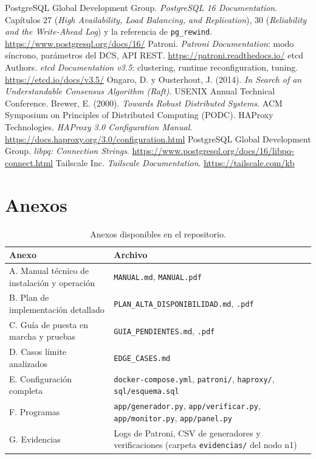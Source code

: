 \documentclass[11pt,a4paper]{article}
\newcommand{\cod}[1]{\texttt{#1}}
\begin{document}
\begin{thebibliography}{9}
 PostgreSQL Global Development Group. \emph{PostgreSQL 16 Documentation}. Capítulos 27 (\emph{High Availability, Load Balancing, and Replication}), 30 (\emph{Reliability and the Write-Ahead Log}) y la referencia de \cod{pg\_rewind}. \url{https://www.postgresql.org/docs/16/}
 Patroni. \emph{Patroni Documentation}: modo síncrono, parámetros del DCS, API REST. \url{https://patroni.readthedocs.io/}
 etcd Authors. \emph{etcd Documentation v3.5}: clustering, runtime reconfiguration, tuning. \url{https://etcd.io/docs/v3.5/}
 Ongaro, D. y Ousterhout, J. (2014). \emph{In Search of an Understandable Consensus Algorithm (Raft)}. USENIX Annual Technical Conference.
 Brewer, E. (2000). \emph{Towards Robust Distributed Systems}. ACM Symposium on Principles of Distributed Computing (PODC).
 HAProxy Technologies. \emph{HAProxy 3.0 Configuration Manual}. \url{https://docs.haproxy.org/3.0/configuration.html}
 PostgreSQL Global Development Group. \emph{libpq: Connection Strings}. \url{https://www.postgresql.org/docs/16/libpq-connect.html}
 Tailscale Inc. \emph{Tailscale Documentation}. \url{https://tailscale.com/kb}
\end{thebibliography}

\section*{Anexos}

\begin{table}[H]
\centering
\small
\caption{Anexos disponibles en el repositorio.}
\begin{tabularx}{\textwidth}{@{}L{6.6cm}Y@{}}
\toprule
\textbf{Anexo} & \textbf{Archivo} \\
\midrule
A. Manual técnico de instalación y operación & \cod{MANUAL.md}, \cod{MANUAL.pdf} \\
B. Plan de implementación detallado & \cod{PLAN\_ALTA\_DISPONIBILIDAD.md}, \cod{.pdf} \\
C. Guía de puesta en marcha y pruebas & \cod{GUIA\_PENDIENTES.md}, \cod{.pdf} \\
D. Casos límite analizados & \cod{EDGE\_CASES.md} \\
E. Configuración completa & \cod{docker-compose.yml}, \cod{patroni/}, \cod{haproxy/}, \cod{sql/esquema.sql} \\
F. Programas & \cod{app/generador.py}, \cod{app/verificar.py}, \cod{app/monitor.py}, \cod{app/panel.py} \\
G. Evidencias & Logs de Patroni, CSV de generadores y verificaciones (carpeta \cod{evidencias/} del nodo n1) \\
\bottomrule
\end{tabularx}
\end{table}
\end{document}

